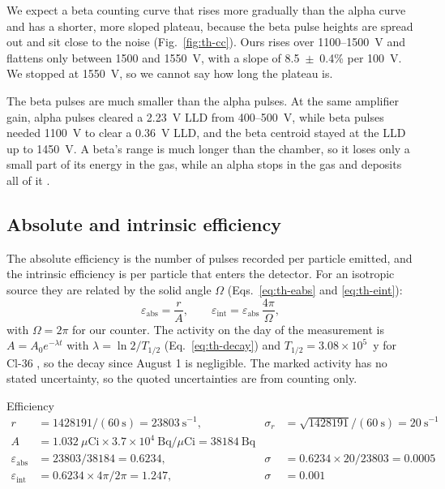 \documentclass[12pt]{article}
\begin{document}
We expect a beta counting curve that rises more gradually than the alpha curve and has a shorter, more sloped plateau, because the beta pulse heights are spread out and sit close to the noise (Fig.~\ref{fig:th-cc}). Ours rises over 1100--1500~V and flattens only between 1500 and 1550~V, with a slope of 8.5~$\pm$~0.4\% per 100~V. We stopped at 1550~V, so we cannot say how long the plateau is.

The beta pulses are much smaller than the alpha pulses. At the same amplifier gain, alpha pulses cleared a 2.23~V LLD from 400--500~V, while beta pulses needed 1100~V to clear a 0.36~V LLD, and the beta centroid stayed at the LLD up to 1450~V. A beta's range is much longer than the chamber, so it loses only a small part of its energy in the gas, while an alpha stops in the gas and deposits all of it \cite{knoll}.

\subsection{Absolute and intrinsic efficiency}

The absolute efficiency is the number of pulses recorded per particle emitted, and the intrinsic efficiency is per particle that enters the detector. For an isotropic source they are related by the solid angle $\Omega$ (Eqs.~\ref{eq:th-eabs} and \ref{eq:th-eint}):
\begin{equation}
\varepsilon_{\text{abs}} = \frac{r}{A}, \qquad \varepsilon_{\text{int}} = \varepsilon_{\text{abs}}\,\frac{4\pi}{\Omega},
\end{equation}
with $\Omega = 2\pi$ for our counter. The activity on the day of the measurement is $A = A_0 e^{-\lambda t}$ with $\lambda = \ln 2/T_{1/2}$ (Eq.~\ref{eq:th-decay}) and $T_{1/2} = 3.08\times10^5$~y for Cl-36 \cite{knoll}, so the decay since August 1 is negligible. The marked activity has no stated uncertainty, so the quoted uncertainties are from counting only.

\begin{samplecalc}{Efficiency}
\begin{align*}
r &= 1428191/(60\ \text{s}) = 23803\ \text{s}^{-1}, & \sigma_r &= \sqrt{1428191}/(60\ \text{s}) = 20\ \text{s}^{-1}\\
A &= 1.032\ \mu\text{Ci} \times 3.7\times10^{4}\ \text{Bq}/\mu\text{Ci} = 38184\ \text{Bq} & &\\
\varepsilon_{\text{abs}} &= 23803/38184 = 0.6234, & \sigma &= 0.6234 \times 20/23803 = 0.0005\\
\varepsilon_{\text{int}} &= 0.6234 \times 4\pi/2\pi = 1.247, & \sigma &= 0.001
\end{align*}
\end{samplecalc}
\end{document}
